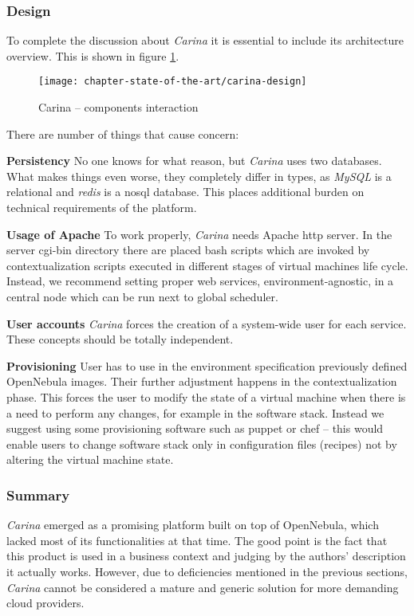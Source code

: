 \subsubsection{Design}
To complete the discussion about \emph{Carina} it is essential to include its architecture overview. This is shown in figure \ref{sota:carina-design}.

\begin{figure}[!ht]
  \begin{center}
    \texttt{[image: chapter-state-of-the-art/carina-design]}
  \end{center}
  \caption{Carina -- components interaction}
  \label{sota:carina-design}
\end{figure}

There are number of things that cause concern:
\begin{asparaenum}
\item[\textbf{Persistency}] No one knows for what reason, but \emph{Carina} uses two databases. What makes things even worse, they completely differ in types, as \emph{MySQL} is a relational and \emph{redis} is a nosql database. This places additional burden on technical requirements of the platform.
\item[\textbf{Usage of Apache}] To work properly, \emph{Carina} needs Apache http server. In the server cgi-bin directory there are placed bash scripts which are invoked by contextualization scripts executed in different stages of virtual machines life cycle. Instead, we recommend setting proper web services, environment-agnostic, in a central node which can be run next to global scheduler.
\item[\textbf{User accounts}] \emph{Carina} forces the creation of a system-wide user for each service. These concepts should be totally independent.
\item[\textbf{Provisioning}] User has to use in the environment specification previously defined OpenNebula images. Their further adjustment happens in the contextualization phase. This forces the user to modify the state of a virtual machine when there is a need to perform any changes, for example in the software stack. Instead we suggest using some provisioning software such as puppet or chef -- this would enable users to change software stack only in configuration files (recipes) not by altering the virtual machine state.
\end{asparaenum}

\subsubsection{Summary}
\emph{Carina} emerged as a promising platform built on top of OpenNebula, which lacked most of its functionalities at that time. The good point is the fact that this product is used in a business context and judging by the authors' description it actually works. However, due to deficiencies mentioned in the previous sections, \emph{Carina} cannot be considered a mature and generic solution for more demanding cloud providers.



